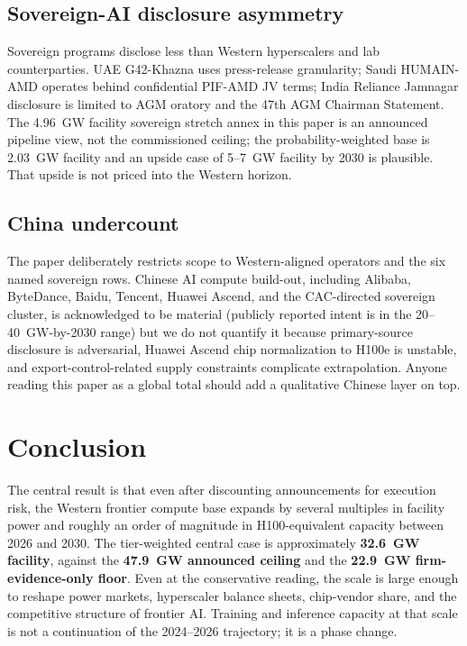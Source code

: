 \documentclass[11pt,a4paper]{article}
\begin{document}
\subsection{Sovereign-AI disclosure asymmetry}

Sovereign programs disclose less than Western hyperscalers and lab counterparties. UAE G42-Khazna uses press-release granularity; Saudi HUMAIN-AMD operates behind confidential PIF-AMD JV terms; India Reliance Jamnagar disclosure is limited to AGM oratory and the 47th AGM Chairman Statement. The 4.96~GW facility sovereign stretch annex in this paper is an announced pipeline view, not the commissioned ceiling; the probability-weighted base is 2.03~GW facility and an upside case of 5--7~GW facility by 2030 is plausible. That upside is not priced into the Western horizon.

\subsection{China undercount}

The paper deliberately restricts scope to Western-aligned operators and the six named sovereign rows. Chinese AI compute build-out, including Alibaba, ByteDance, Baidu, Tencent, Huawei Ascend, and the CAC-directed sovereign cluster, is acknowledged to be material (publicly reported intent is in the 20--40~GW-by-2030 range) but we do not quantify it because primary-source disclosure is adversarial, Huawei Ascend chip normalization to H100e is unstable, and export-control-related supply constraints complicate extrapolation. Anyone reading this paper as a global total should add a qualitative Chinese layer on top.

\section{Conclusion}

The central result is that even after discounting announcements for execution risk, the Western frontier compute base expands by several multiples in facility power and roughly an order of magnitude in H100-equivalent capacity between 2026 and 2030. The tier-weighted central case is approximately \textbf{32.6~GW facility}, against the \textbf{47.9~GW announced ceiling} and the \textbf{22.9~GW firm-evidence-only floor}. Even at the conservative reading, the scale is large enough to reshape power markets, hyperscaler balance sheets, chip-vendor share, and the competitive structure of frontier AI. Training and inference capacity at that scale is not a continuation of the 2024--2026 trajectory; it is a phase change.
\end{document}
